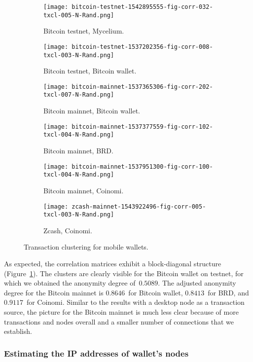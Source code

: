 \begin{figure}
	\centering
	\begin{subfigure}{.5\textwidth}
		\centering
		\texttt{[image: bitcoin-testnet-1542895555-fig-corr-032-txcl-005-N-Rand.png]}
		\caption{Bitcoin testnet, Mycelium.}
	\end{subfigure}%
	\begin{subfigure}{.5\textwidth}
		\centering
		\texttt{[image: bitcoin-testnet-1537202356-fig-corr-008-txcl-003-N-Rand.png]}
		\caption{Bitcoin testnet, Bitcoin wallet.}
	\end{subfigure}
	\begin{subfigure}{.5\textwidth}
		\centering
		\texttt{[image: bitcoin-mainnet-1537365306-fig-corr-202-txcl-007-N-Rand.png]}
		\caption{Bitcoin mainnet, Bitcoin wallet.}
	\end{subfigure}%
	\begin{subfigure}{.5\textwidth}
		\centering
		\texttt{[image: bitcoin-mainnet-1537377559-fig-corr-102-txcl-004-N-Rand.png]}
		\caption{Bitcoin mainnet, BRD.}
	\end{subfigure}
	\begin{subfigure}{.5\textwidth}
		\centering
		\texttt{[image: bitcoin-mainnet-1537951300-fig-corr-100-txcl-004-N-Rand.png]}
		\caption{Bitcoin mainnet, Coinomi.}
	\end{subfigure}%
	\begin{subfigure}{.5\textwidth}
		\centering
		\texttt{[image: zcash-mainnet-1543922496-fig-corr-005-txcl-003-N-Rand.png]}
		\caption{Zcash, Coinomi.}
	\end{subfigure}
	\caption{Transaction clustering for mobile wallets.}
	\label{fig:clustering-all}
\end{figure}

As expected, the correlation matrices exhibit a block-diagonal structure (Figure~\ref{fig:clustering-all}).
The clusters are clearly visible for the Bitcoin wallet on testnet, for which we obtained the anonymity degree of~$0.5089$.
The adjusted anonymity degree for the Bitcoin mainnet is $0.8646$~for Bitcoin wallet, $0.8413$~for BRD, and~$0.9117$~for Coinomi.
Similar to the results with a desktop node as a transaction source, the picture for the Bitcoin mainnet is much less clear because of more transactions and nodes overall and a smaller number of connections that we establish.


\subsubsection*{Estimating the IP addresses of wallet's nodes}

